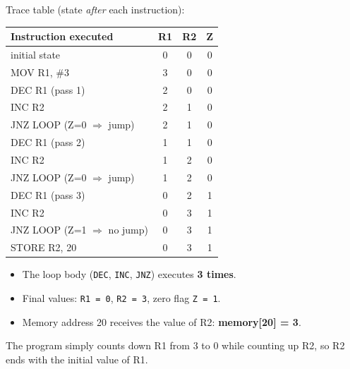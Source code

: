 \documentclass[11pt]{article}
\begin{document}
\begin{corrige}
Trace table (state \emph{after} each instruction):

\begin{center}
\begin{tabular}{|l|c|c|c|}
\hline
\rowcolor{popblueL} \textbf{Instruction executed} & \textbf{R1} & \textbf{R2} & \textbf{Z} \\
\hline
initial state & 0 & 0 & 0 \\
MOV R1, \#3 & 3 & 0 & 0 \\
DEC R1 (pass 1) & 2 & 0 & 0 \\
INC R2 & 2 & 1 & 0 \\
JNZ LOOP (Z=0 $\Rightarrow$ jump) & 2 & 1 & 0 \\
DEC R1 (pass 2) & 1 & 1 & 0 \\
INC R2 & 1 & 2 & 0 \\
JNZ LOOP (Z=0 $\Rightarrow$ jump) & 1 & 2 & 0 \\
DEC R1 (pass 3) & 0 & 2 & 1 \\
INC R2 & 0 & 3 & 1 \\
JNZ LOOP (Z=1 $\Rightarrow$ no jump) & 0 & 3 & 1 \\
STORE R2, 20 & 0 & 3 & 1 \\
\hline
\end{tabular}
\end{center}

\begin{itemize}
\item The loop body (\texttt{DEC}, \texttt{INC}, \texttt{JNZ}) executes \textbf{3 times}.
\item Final values: \texttt{R1 = 0}, \texttt{R2 = 3}, zero flag \texttt{Z = 1}.
\item Memory address 20 receives the value of R2: \textbf{memory[20] = 3}.
\end{itemize}
The program simply counts down R1 from 3 to 0 while counting up R2, so R2 ends with the initial value of R1.
\end{corrige}
\end{document}
